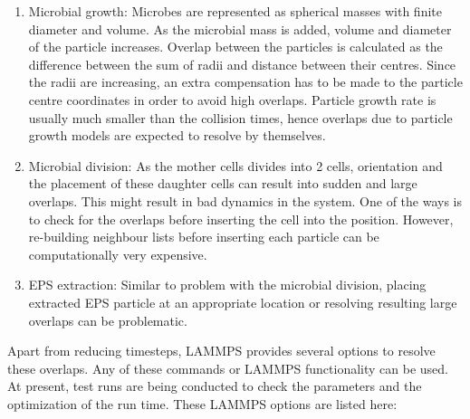 \documentclass[11pt,a4paper,openright]{article}
\begin{document}
\begin{enumerate}
\item Microbial growth: Microbes are represented as spherical masses with finite diameter and volume. As the microbial mass is added, volume and diameter of the particle increases. Overlap between the particles is calculated as the difference between the sum of radii and distance between their centres. Since the radii are increasing, an extra compensation has to be made to the particle centre coordinates in order to avoid high overlaps. Particle growth rate is usually much smaller than the collision times, hence overlaps due to particle growth models are expected to resolve by themselves. 

\item Microbial division: As the mother cells divides into 2 cells, orientation and the placement of these daughter cells can result into sudden and large overlaps. This might result in bad dynamics in the system. One of the ways is to check for the overlaps before inserting the cell into the position. However, re-building neighbour lists before inserting each particle can be computationally very expensive. 

\item EPS extraction: Similar to problem with the microbial division, placing extracted EPS particle at an appropriate location or resolving resulting large overlaps can be problematic. 
\end{enumerate} 

Apart from reducing timesteps, LAMMPS provides several options to resolve these overlaps. Any of these commands or LAMMPS functionality can be used. At present, test runs are being conducted to check the parameters and the optimization of the run time. These LAMMPS options are listed here: 
\end{document}
